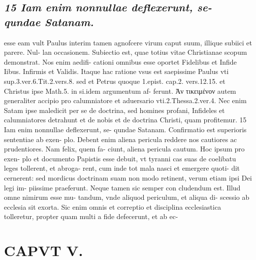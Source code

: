 \documentclass{article}
\begin{document}
\begin{pages}
\subsection*{\textit{15 Iam enim nonnullae deflexerunt, se- qundae Satanam.}}esse eam vult Paulus interim tamen agnofcere virum caput suum, illique subiici et parere. Nul- lan occasionem. Subiectio est, quae totius vitae Christianae scopum demonstrat. Nos enim aedifi- cationi omnibus esse oportet Fidelibus et Infide Iibus. Infirmis et Validis. Itaque hac ratione vsus est saepissime Paulus vti sup.3.ver.6.Tit.2.vers.8. sed et Petrus quoque 1.epist. cap.2. vers.12.15. et Christus ipse Math.5. in si.idem argumentum af- ferunt. Ἀν τικειμένον autem generaliter accipio pro calumniatore et aduersario vti.2.Thessa.2.ver.4. Nec enim Satam ipse maledicit per se de doctrina, sed homines profani, Infideles et calumniatores detrahunt et de nobis et de doctrina Christi, quam profitemur. 15 Iam enim nonnullae deflexerunt, se- qundae Satanam. Confirmatio est superioris sententiae ab exen- plo. Debent enim aliena pericula reddere nos cautiores ac prudentiores. Nam felix, quem fa- ciunt, aliena pericula cautum. Hoc ipsum pro exen- plo et documento Papistis esse debuit, vt tyranni cas suas de coelibatu leges tollerent, et abroga- rent, cum inde tot mala nasci et emergere quoti- dit cernerent: sed mordicus doctrinam suam non modo retinent, verum etiam ipsi Dei legi im- piissime praeferunt. Neque tamen sic semper con cludendum est. Illud omne nimirum esse mu- tandum, vnde aliquod periculum, et aliqua di- scessio ab ecclesia sit exorta. Sic enim omnis et correptio et disciplina ecclesiastica tolleretur, propter quam multi a fide defecerunt, et ab ec-  \pend
\section*{CAPVT  V. }
\marginpar{[ p.301 ]}\pstart {}
{}

\end{pages}
\end{document}
